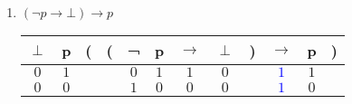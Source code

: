 \begin{problem}[7]
\begin{enumerate}
\begin{center}
\end{center}
\item \textbf{$(¬p → ⊥) → p$}
\begin{center}

\begin{tabular}{|@{ }c@{ }@{ }c | c@{}@{}c@{}@{ }c@{ }@{ }c@{ }@{ }c@{ }@{ }c@{ }@{}c@{}@{ }c@{ }@{ }c@{ }@{}c@{ }|}\hline
$\perp$ & p & ( & ( & ¬ & p & $\rightarrow$ & $\perp$ & ) & $\rightarrow$ & p & )\\
\hline
$0$ & $1$ &  &  & $0$ & $1$ & $1$ & $0$ &  & \textcolor{blue}{$1$} & $1$ & \\\hline
$0$ & $0$ &  &  & $1$ & $0$ & $0$ & $0$ &  & \textcolor{blue}{$1$} & $0$ & \\\hline
\end{tabular}
\end{center}
\end{enumerate}
\end{problem}



